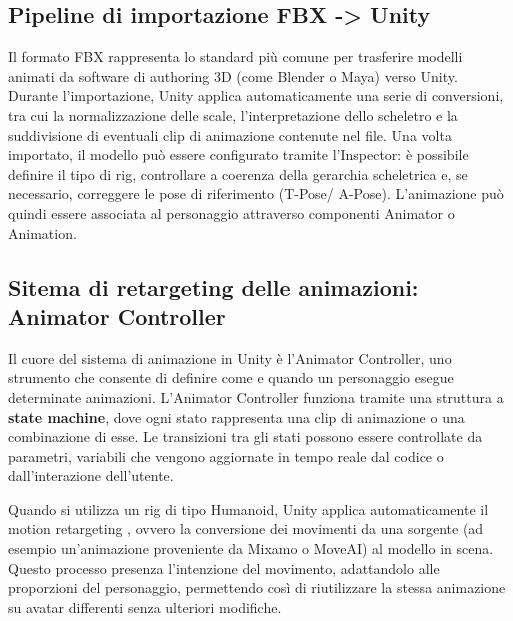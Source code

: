 \subsection{Pipeline di importazione FBX -> Unity}
Il formato FBX rappresenta lo standard più comune per trasferire modelli animati da software di authoring 3D (come Blender o  Maya) verso Unity. Durante l'importazione, Unity applica automaticamente una serie di conversioni, tra cui la normalizzazione delle scale, l'interpretazione dello scheletro e la suddivisione di eventuali clip di animazione contenute nel file.
Una volta importato, il modello può essere configurato tramite l'Inspector: è possibile definire il tipo di rig, controllare a coerenza della gerarchia scheletrica e, se necessario, correggere le pose di riferimento (T-Pose/ A-Pose). L'animazione può quindi essere associata al personaggio attraverso componenti Animator o Animation.

\subsection{Sitema di retargeting delle animazioni: Animator Controller}
Il cuore del sistema di animazione in Unity è l'Animator Controller, uno strumento che consente di definire come e quando un personaggio esegue determinate animazioni. L'Animator Controller funziona tramite una struttura a \textbf{state machine}, dove ogni stato rappresenta una clip di animazione o una combinazione di esse. Le transizioni tra gli stati possono essere controllate da parametri, variabili che vengono aggiornate in tempo reale dal codice o dall'interazione dell'utente.

Quando si utilizza un rig di tipo Humanoid, Unity applica automaticamente il motion retargeting , ovvero la conversione dei movimenti da una sorgente (ad esempio un'animazione proveniente da Mixamo o MoveAI) al modello in scena. Questo processo presenza l'intenzione del movimento, adattandolo alle proporzioni del personaggio, permettendo così di riutilizzare la stessa animazione su avatar differenti senza ulteriori modifiche.